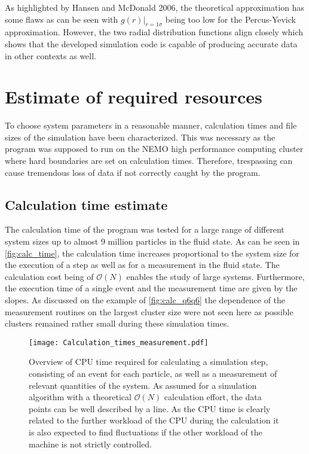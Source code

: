 As highlighted by Hansen and McDonald 2006\cite{Hansen2006}, the theoretical approximation has some flaws as can be seen with $g(r)|_{r=1\sigma}$ being too low for the Percus-Yevick approximation. However, the two radial distribution functions align closely which shows that the developed simulation code is capable of producing accurate data in other contexts as well.

\section{Estimate of required resources}
\label{sec:resources}
To choose system parameters in a reasonable manner, calculation times and file sizes of the simulation have been characterized. This was necessary as the program was supposed to run on the NEMO high performance computing cluster where hard boundaries are set on calculation times. Therefore, trespassing can cause tremendous loss of data if not correctly caught by the program.
 
\subsection{Calculation time estimate}
\label{sec:calc_times}
The calculation time of the program was tested for a large range of different system sizes up to almost 9 million particles in the fluid state. As can be seen in \autoref{fig:calc_time}, the calculation time increases proportional to the system size for the execution of a step as well as for a measurement in the fluid state. The calculation cost being of $\mathcal{O}(N)$ enables the study of large systems. Furthermore, the execution time of a single event and the measurement time are given by the slopes. As discussed on the example of \autoref{fig:calc_q6q6} the dependence of the measurement routines on the largest cluster size were not seen here as possible clusters remained rather small during these simulation times.

\begin{figure}[h!]
\centering
\texttt{[image: Calculation\_times\_measurement.pdf]}
\caption[Calculation time estimate of the simulation]{Overview of CPU time required for calculating a simulation step, consisting of an event for each particle, as well as a measurement of relevant quantities of the system. As assumed for a simulation algorithm with a theoretical $\mathcal{O}(N)$ calculation effort, the data points can be well described by a line. As the CPU time is clearly related to the further workload of the CPU during the calculation it is also expected to find fluctuations if the other workload of the machine is not strictly controlled.}
\label{fig:calc_time}
\end{figure}

